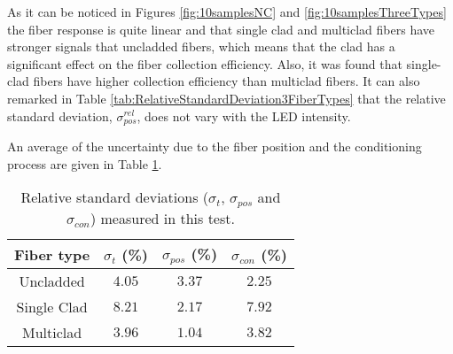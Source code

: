 As it can be noticed in Figures \ref{fig:10samplesNC} and \ref{fig:10samplesThreeTypes} the fiber response is quite linear and that single clad and multiclad fibers have stronger signals that uncladded fibers, which means that the clad has a significant effect on the fiber collection efficiency. Also, it was found that single-clad fibers have higher collection efficiency than multiclad fibers. It can also remarked in Table \ref{tab:RelativeStandardDeviation3FiberTypes} that the relative standard deviation, $\sigma^{rel}_{pos}$, does not vary with the LED intensity.



An average of the uncertainty due to the fiber position and the conditioning process are given in Table \ref{tab:RelativeStandardDeviations}.

\begin{table}[htbp]
\begin{center}
\begin{tabular}{|c|c|c|c|}
\hline
Fiber type & $\sigma_t$ (\%) & $\sigma_{pos}$ (\%) & $\sigma_{con}$ (\%)\\\hline \hline \hline
Uncladded & $4.05$ & $3.37$ & $2.25$ \\ \hline
Single Clad & $8.21$ & $2.17$ & $7.92$ \\ \hline
Multiclad & $3.96$ & $1.04$ & $3.82$ \\ \hline
\end{tabular}
\caption{Relative standard deviations ($\sigma_t$, $\sigma_{pos}$ and $\sigma_{con}$) measured in this test.}
\label{tab:RelativeStandardDeviations}
\end{center}
\end{table}

